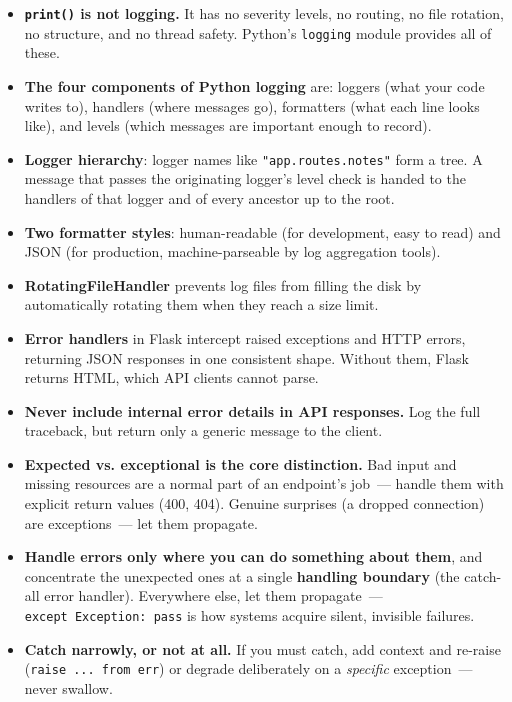 \label{16-logging-error-handling:key-takeaways}
\begin{takeaways}

\begin{itemize}
\tightlist
\item
  \textbf{\texttt{print()} is not logging.} It has no severity levels, no routing, no file rotation, no structure, and no thread safety. Python's \texttt{logging} module provides all of these.
\item
  \textbf{The four components of Python logging} are: loggers (what your code writes to), handlers (where messages go), formatters (what each line looks like), and levels (which messages are important enough to record).
\item
  \textbf{Logger hierarchy}: logger names like \texttt{"app.routes.notes"} form a tree. A message that passes the originating logger's level check is handed to the handlers of that logger and of every ancestor up to the root.
\item
  \textbf{Two formatter styles}: human-readable (for development, easy to read) and JSON (for production, machine-parseable by log aggregation tools).
\item
  \textbf{RotatingFileHandler} prevents log files from filling the disk by automatically rotating them when they reach a size limit.
\item
  \textbf{Error handlers} in Flask intercept raised exceptions and HTTP errors, returning JSON responses in one consistent shape. Without them, Flask returns HTML, which API clients cannot parse.
\item
  \textbf{Never include internal error details in API responses.} Log the full traceback, but return only a generic message to the client.
\item
  \textbf{Expected vs. exceptional is the core distinction.} Bad input and missing resources are a normal part of an endpoint's job~--- handle them with explicit return values (400, 404). Genuine surprises (a dropped connection) are exceptions~--- let them propagate.
\item
  \textbf{Handle errors only where you can do something about them}, and concentrate the unexpected ones at a single \textbf{handling boundary} (the catch-all error handler). Everywhere else, let them propagate~--- \texttt{except\ Exception:\ pass} is how systems acquire silent, invisible failures.
\item
  \textbf{Catch narrowly, or not at all.} If you must catch, add context and re-raise (\texttt{raise\ ...\ from\ err}) or degrade deliberately on a \emph{specific} exception~--- never swallow.

\end{itemize}
\end{takeaways}
